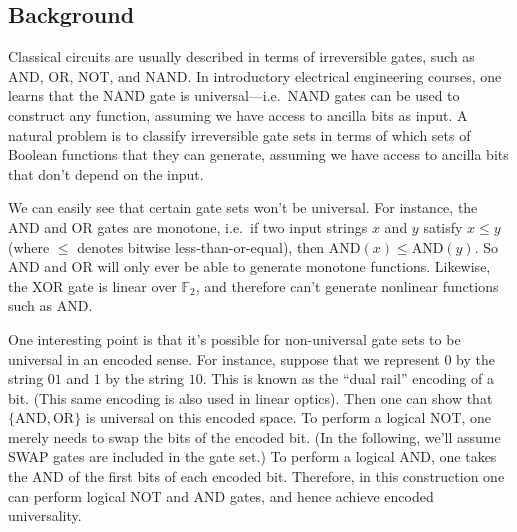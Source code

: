 \documentclass[12pt]{report}
\theoremstyle{plain}
\theoremstyle{definition}
\begin{document}
\subsection{Background}

Classical circuits are usually described in terms of irreversible gates, such as AND, OR, NOT, and NAND. In introductory electrical engineering courses, one learns that the NAND gate is universal---i.e.\ NAND gates can be used to construct any function, assuming we have access to ancilla bits as input. A natural problem is to classify irreversible gate sets in terms of which sets of Boolean functions that they can generate, assuming we have access to ancilla bits that don't depend on the input.

We can easily see that certain gate sets won't be universal. For instance, the AND and OR gates are monotone, i.e.\ if two input strings $x$ and $y$ satisfy $x\leq y$ (where $\leq$ denotes bitwise less-than-or-equal), then $\mathrm{AND}(x)\leq \mathrm{AND}(y)$.  So AND and OR will only ever be able to generate monotone functions. Likewise, the XOR gate is linear over $\mathbb{F}_2$, and therefore can't generate nonlinear functions such as AND.

One interesting point is that it's possible for non-universal gate sets to be universal in an encoded sense. For instance, suppose that we represent $0$ by the string $01$ and $1$ by the string $10$. This is known as the ``dual rail'' encoding of a bit. (This same encoding is also used in linear optics). Then one can show that $\{\mathrm{AND},\mathrm{OR}\}$ is universal on this encoded space. To perform a logical NOT, one merely needs to swap the bits of the encoded bit. (In the following, we'll assume SWAP gates are included in the gate set.) To perform a logical AND, one takes the AND of the first bits of each encoded bit.  Therefore, in this construction one can perform logical NOT and AND gates, and hence achieve encoded universality.
\end{document}
